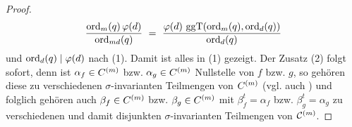\begin{proof}
  \[ \frac{\operatorname{ord}_m(q)\,\varphi(d)}{\operatorname{ord}_{md}(q)} \ =\ 
    \frac{\varphi(d)\, \operatorname{ggT}(\operatorname{ord}_m(q),\operatorname{ord}_d(q))}{\operatorname{ord}_d(q)}\]
  und $\operatorname{ord}_d(q) \mid \varphi(d)$ nach  (1).
  Damit ist alles in (1) gezeigt.
  Der Zusatz (2) folgt sofort, denn ist $\alpha_f \in C^{(m)}$ 
  bzw. $\alpha_g \in C^{(m)}$ Nullstelle von $f$ bzw. $g$, so gehören diese zu 
  verschiedenen $\sigma$-invarianten Teilmengen von $C^{(m)}$ (vgl. 
  auch ) und folglich gehören auch
  $\beta_f\in C^{(m)}$ bzw. $\beta_g\in C^{(m)}$ mit $\beta_f^t = \alpha_f$ bzw.
  $\beta_g^t = \alpha_g$ zu verschiedenen und damit disjunkten
  $\sigma$-invarianten Teilmengen von $\mathcal{C}^{(m)}$.
\end{proof}

